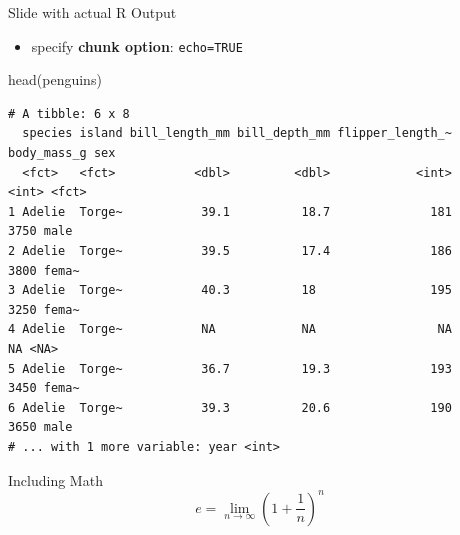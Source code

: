 \documentclass[
  10pt,
  ignorenonframetext,
]{beamer}
\newenvironment{Shaded}{\begin{snugshade}}{\end{snugshade}}
\newcommand{\FunctionTok}[1]{\textcolor[rgb]{0.00,0.00,0.00}{#1}}
\newcommand{\NormalTok}[1]{#1}
\providecommand{\tightlist}{%
  \setlength{\itemsep}{0pt}\setlength{\parskip}{0pt}}
\begin{document}
\begin{frame}[fragile]{Slide with actual R Output}
\protect\hypertarget{slide-with-actual-r-output}{}
\begin{itemize}[<+->]
\tightlist
\item
  specify \textbf{chunk option}: \texttt{echo=TRUE}
\end{itemize}

\begin{Shaded}
\begin{Highlighting}[]
\FunctionTok{head}\NormalTok{(penguins)}
\end{Highlighting}
\end{Shaded}

\begin{verbatim}
# A tibble: 6 x 8
  species island bill_length_mm bill_depth_mm flipper_length_~ body_mass_g sex  
  <fct>   <fct>           <dbl>         <dbl>            <int>       <int> <fct>
1 Adelie  Torge~           39.1          18.7              181        3750 male 
2 Adelie  Torge~           39.5          17.4              186        3800 fema~
3 Adelie  Torge~           40.3          18                195        3250 fema~
4 Adelie  Torge~           NA            NA                 NA          NA <NA> 
5 Adelie  Torge~           36.7          19.3              193        3450 fema~
6 Adelie  Torge~           39.3          20.6              190        3650 male 
# ... with 1 more variable: year <int>
\end{verbatim}
\end{frame}

\begin{frame}{Including Math}
\protect\hypertarget{including-math}{}
\begin{equation*}
    e = \lim_{n\to \infty} \left(1 + \frac{1}{n}\right)^n
\end{equation*}
\end{frame}
\end{document}
